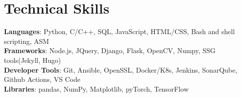 \documentclass[letterpaper,11pt]{article}
\begin{document}
%
\section{Technical Skills}
 \begin{itemize}[leftmargin=0.15in, label={}]
    \small{\item{
     \textbf{Languages}{: Python, C/C++, SQL, JavaScript, HTML/CSS, Bash and shell scripting, ASM} \\
     \textbf{Frameworks}{: Node.js, JQuery, Django, Flask, OpenCV, Numpy, SSG tools(Jekyll, Hugo)} \\
     \textbf{Developer Tools}{: Git, Ansible, OpenSSL, Docker/K8s, Jenkins, SonarQube, Github Actions, VS Code} \\
      \textbf{Libraries}{: pandas, NumPy, Matplotlib, pyTorch, TensorFlow}
    }}
 \end{itemize}


\end{document}
